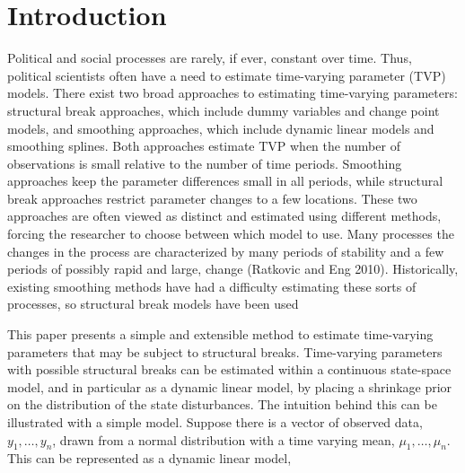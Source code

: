 
\newcommand{\ModelII}[1]{\texttt{#1}}


\section{Introduction}
\label{dlm:sec:introduction}

Political and social processes are rarely, if ever, constant over time.
Thus, political scientists often have a need to estimate time-varying parameter (TVP) models.
There exist two broad approaches to estimating time-varying parameters: structural break approaches, which include dummy variables and change point models, and smoothing approaches, which include dynamic linear models and smoothing splines. 
Both approaches estimate TVP when the number of observations is small relative to the number of time periods. 
Smoothing approaches keep the parameter differences small in all periods, while structural break approaches restrict parameter changes to a few locations. 
These two approaches are often viewed as distinct and estimated using different methods, forcing the researcher to choose between which model to use.
Many processes the changes in the process are characterized by many periods of stability and a few periods of possibly rapid and large, change (Ratkovic and Eng 2010).
Historically, existing smoothing methods have had a difficulty estimating these sorts of processes, so structural break models have been used

This paper presents a simple and extensible method to estimate time-varying parameters that may be subject to structural breaks. 
Time-varying parameters with possible structural breaks can be estimated within a continuous state-space model, and in particular as a dynamic linear model, by placing a shrinkage prior on the distribution of the state disturbances.
The intuition behind this can be illustrated with a simple model.
Suppose there is a vector of observed data, $y_{1}, \dots, y_{n}$, drawn from a normal distribution with a time varying mean, $\mu_{1}, \dots, \mu_{n}$.
This can be represented as a dynamic linear model,

